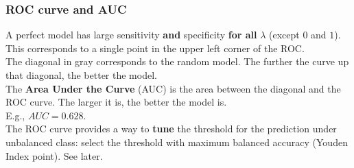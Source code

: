 \begin{frame}
\frametitle{ROC curve and AUC}
A perfect model has large sensitivity {\bf and} specificity {\bf for all} $\lambda$ (except $0$ and $1$). This corresponds to a single point in the upper left corner of the ROC.\\
\vspace{0.2cm}
The diagonal in gray corresponds to the random model. The further the curve up that diagonal, the better the model. \\
\vspace{0.2cm}
The {\bf Area Under the Curve} (AUC) is the area between the diagonal and the ROC curve. The larger it is, the better the model is.\\
\vspace{0.2cm}
E.g., $AUC=0.628$.\\
\vspace{0.2cm}
The ROC curve provides a way to {\bf tune} the threshold for the prediction under unbalanced class: select the threshold with maximum balanced accuracy (Youden Index point). See later.
\end{frame}
